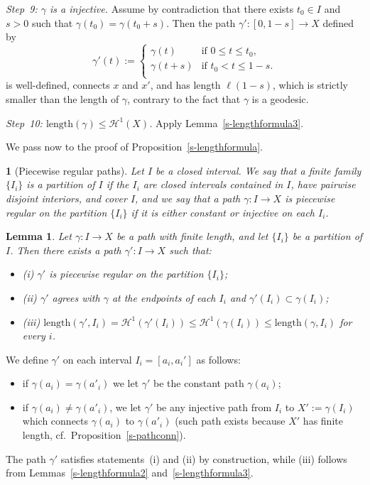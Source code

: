 \documentclass[11pt,reqno,a4paper,final]{amsart}
\makeatletter
\numberwithin{equation}{section}
\theoremstyle{mytheorem}
\newtheorem{lemma}[subsection]{Lemma}
\theoremstyle{myremark}
\theoremstyle{myparagraph}
\newtheorem{parag}[subsection]{}
\renewenvironment{proof}[1][\proofname]{\par 
  \pushQED{\qed}%
  \normalfont \topsep10\p@\@plus6\p@\relax 
  \trivlist 
  \item[\hskip\labelsep 
    \bfseries 
    #1\@addpunct{.}]\ignorespaces 
}{%
  \popQED\endtrivlist\@endpefalse 
}
\providecommand{\proofname}{Proof}
\newenvironment{itemizeb}
{\begin{itemize}\itemsep=2pt\leftskip -5 pt}
{\end{itemize}}
\newcommand{\Haus}{\mathscr{H}}
\newcommand{\Len}{\mathrm{length}}
\makeatother
\begin{document}
\begin{proof}[Proof of Proposition~\ref{s-pathconn}]
\medskip
\emph{Step~9: $\gamma$ is a injective.}
Assume by contradiction that there exists $t_0\in I$ and $s>0$ such that 
$\gamma(t_0)=\gamma(t_0+s)$. 
Then the path $\gamma':[0,1-s]\to X$ 
defined by
\[
\gamma'(t):=
\begin{cases}
  \gamma(t) & \text{if $0 \le t\le t_0$,} \\
  \gamma(t+s) & \text{if $t_0 < t\le 1-s$.} \\
\end{cases}
\]
is well-defined, connects $x$ and $x'$, and has length $\ell(1-s)$,
which is strictly smaller than the length of $\gamma$, 
contrary to the fact that $\gamma$ is a geodesic. 

\medskip
\emph{Step~10: $\Len(\gamma) \le \Haus^1(X)$.} 
Apply Lemma~\ref{s-lengthformula3}.
\end{proof}


We pass now to the proof of Proposition~\ref{s-lengthformula}.

\begin{parag}[Piecewise regular paths]
\label{s-piecewisereg}
Let $I$ be a closed interval.
We say that a finite family 
$\{I_i\}$ is a \emph{partition} of $I$ 
if the $I_i$ are closed intervals contained in $I$, 
have pairwise disjoint interiors, and cover $I$,
and we say that a path $\gamma:I\to X$ is \emph{piecewise regular}
on the partition $\{I_i\}$ 
if it is either constant or injective on each $I_i$.
\end{parag}

\begin{lemma}
\label{s-pathapprox}
Let $\gamma:I\to X$ be a path with finite length, 
and let $\{I_i\}$ be a partition of $I$.
Then there exists a path $\gamma' : I \to X$ 
such that:
%
\begin{itemizeb}
\item[(i)]
$\gamma'$ is piecewise regular on the partition $\{I_i\}$;
\item[(ii)]
$\gamma'$ agrees with $\gamma$ at the endpoints of each $I_i$
and $\gamma'(I_i)\subset\gamma(I_i)$;
\item[(iii)]
$\Len(\gamma',I_i) 
= \Haus^1(\gamma'(I_i)) 
\le \Haus^1(\gamma(I_i)) 
\le \Len(\gamma,I_i)$ for every $i$.
\end{itemizeb}
%
\end{lemma}

\begin{proof}
We define $\gamma'$ on each interval $I_i=[a_i,a_i']$ as follows: 
%
\begin{itemizeb}
\item
if $\gamma(a_i)=\gamma(a'_i)$ we let
$\gamma'$ be the constant path $\gamma(a_i)$;
\item
if $\gamma(a_i)\ne\gamma(a'_i)$, we let $\gamma'$ be
any injective path from $I_i$ to $X':=\gamma(I_i)$ 
which connects $\gamma(a_i)$ to $\gamma(a'_i)$
(such path exists because $X'$ has finite length, 
cf.~Proposition~\ref{s-pathconn}).
\end{itemizeb}
%
The path $\gamma'$ satisfies statements~(i) and (ii)
by construction, while (iii) follows from
Lemmas~\ref{s-lengthformula2} and~\ref{s-lengthformula3}.
\end{proof}
\end{document}
